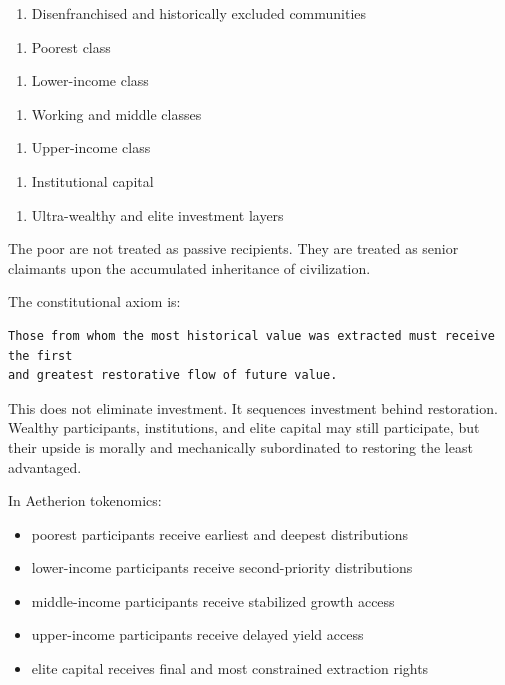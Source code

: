 ﻿\documentclass[12pt]{article}
\begin{document}
\begin{enumerate}
  \item Disenfranchised and historically excluded communities
\end{enumerate}
\begin{enumerate}
  \item Poorest class
\end{enumerate}
\begin{enumerate}
  \item Lower-income class
\end{enumerate}
\begin{enumerate}
  \item Working and middle classes
\end{enumerate}
\begin{enumerate}
  \item Upper-income class
\end{enumerate}
\begin{enumerate}
  \item Institutional capital
\end{enumerate}
\begin{enumerate}
  \item Ultra-wealthy and elite investment layers
\end{enumerate}

The poor are not treated as passive recipients. They are treated as senior claimants upon the accumulated inheritance of civilization.

The constitutional axiom is:

\begin{verbatim}
Those from whom the most historical value was extracted must receive the first
and greatest restorative flow of future value.
\end{verbatim}

This does not eliminate investment. It sequences investment behind restoration. Wealthy participants, institutions, and elite capital may still participate, but their upside is morally and mechanically subordinated to restoring the least advantaged.

In Aetherion tokenomics:

\begin{itemize}
  \item poorest participants receive earliest and deepest distributions
\end{itemize}
\begin{itemize}
  \item lower-income participants receive second-priority distributions
\end{itemize}
\begin{itemize}
  \item middle-income participants receive stabilized growth access
\end{itemize}
\begin{itemize}
  \item upper-income participants receive delayed yield access
\end{itemize}
\begin{itemize}
  \item elite capital receives final and most constrained extraction rights
\end{itemize}
\end{document}
